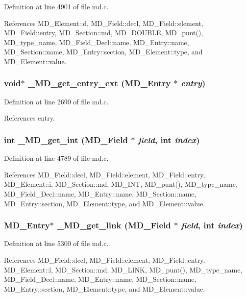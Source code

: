 Definition at line 4901 of file md.c.

References MD\_\-Element::d, MD\_\-Field::decl, MD\_\-Field::element, MD\_\-Field::entry, MD\_\-Section::md, MD\_\-DOUBLE, MD\_\-punt(), MD\_\-type\_\-name, MD\_\-Field\_\-Decl::name, MD\_\-Entry::name, MD\_\-Section::name, MD\_\-Entry::section, MD\_\-Element::type, and MD\_\-Element::value.
\subsubsection{\setlength{\rightskip}{0pt plus 5cm}void$\ast$ \_\-MD\_\-get\_\-entry\_\-ext (\bf{MD\_\-Entry} $\ast$ {\em entry})}\label{md_8h_2001829b3be52003a3b15a88869247e2}




Definition at line 2690 of file md.c.

References entry.
\subsubsection{\setlength{\rightskip}{0pt plus 5cm}int \_\-MD\_\-get\_\-int (\bf{MD\_\-Field} $\ast$ {\em field}, int {\em index})}\label{md_8h_529416a7ce86534b43b997b3b95f18b6}




Definition at line 4789 of file md.c.

References MD\_\-Field::decl, MD\_\-Field::element, MD\_\-Field::entry, MD\_\-Element::i, MD\_\-Section::md, MD\_\-INT, MD\_\-punt(), MD\_\-type\_\-name, MD\_\-Field\_\-Decl::name, MD\_\-Entry::name, MD\_\-Section::name, MD\_\-Entry::section, MD\_\-Element::type, and MD\_\-Element::value.
\subsubsection{\setlength{\rightskip}{0pt plus 5cm}\bf{MD\_\-Entry}$\ast$ \_\-MD\_\-get\_\-link (\bf{MD\_\-Field} $\ast$ {\em field}, int {\em index})}\label{md_8h_5a91daf1e0a99ee2f0ba4155360689d1}




Definition at line 5300 of file md.c.

References MD\_\-Field::decl, MD\_\-Field::element, MD\_\-Field::entry, MD\_\-Element::l, MD\_\-Section::md, MD\_\-LINK, MD\_\-punt(), MD\_\-type\_\-name, MD\_\-Field\_\-Decl::name, MD\_\-Entry::name, MD\_\-Section::name, MD\_\-Entry::section, MD\_\-Element::type, and MD\_\-Element::value.

